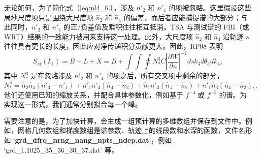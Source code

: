 无论如何，为了简化式（\ref{eq:nl4_6}），涉及 $n'_2$ 和 $n'_4$ 的项被忽略。这里假设这些局地尺度项只是围绕大尺度项 $\hat{n}_2$ 和 $\hat{n}_4$ 的偏差，而后者应能捕捉谱的大部分；与此同时，$n'_2$ 和 $n'_4$ 的正/负差值及乘积往往相互抵消。TSA 与测试谱的 FBI（或 WRT）结果的一致能力被用来支持这一处理。此外，大尺度项 $\hat{n}_2$ 和 $\hat{n}_4$ 沿轨迹 $s$ 往往具有更长的长度，因此应对净传递积分贡献更大。因此，RP08 表明
\begin{equation}
S_{nl}(k_1) = B+L+X=B + \int\int \oint N^3_* C\left| \frac{\partial W}{\partial n} \right|^{-1} ds k_3 d\theta_3dk_3, \label{eq:nl4_8}
\end{equation}                   
其中 $N^3_*$ 是在忽略涉及 $n'_2$ 和 $n'_4$ 的项之后，所有交叉项中剩余的部分，
\begin{equation}
N^3_*=\hat{n}_2 \hat{n}_4 (n'_3-n'_1)+n'_1 n'_3(\hat{n}_4-\hat{n}_2)+\hat{n}_1n'_3(\hat{n}_4-\hat{n}_2)+n'_1\hat{n}_3(\hat{n}_4-\hat{n}_2),.
\end{equation}
他们还使用已知的缩放关系，并配合具体参数化，例如基于 $f^{-4}$ 或 $f^{-5}$ 的谱。为实现这一形式，我们通常分别拟合每一个峰。


需要注意的是，为了加快计算，会生成一组预计算的多维数组并保存到文件中。例如，网格几何数组和梯度数组是谱参数、轨迹上的线段数和水深的函数，文件名形如 `\textbf{grd\_dfrq\_nrng\_nang\_npts\_ndep.dat}'，例如 `grd\-\_1.1025\-\_35\-\_36\-\_30\-\_37\-.dat' 等。

